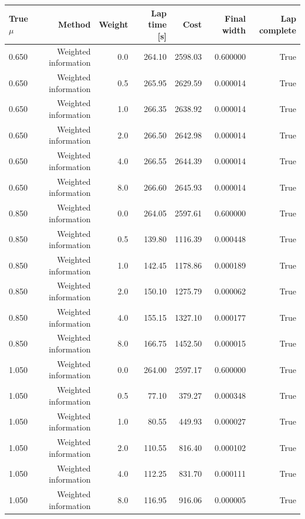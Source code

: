 \begin{tabular}{lrrrrrr}
\toprule
True $\mu$ & Method & Weight & Lap time [s] & Cost & Final width & Lap complete \\
\midrule
0.650 & Weighted information & 0.0 & 264.10 & 2598.03 & 0.600000 & True \\
0.650 & Weighted information & 0.5 & 265.95 & 2629.59 & 0.000014 & True \\
0.650 & Weighted information & 1.0 & 266.35 & 2638.92 & 0.000014 & True \\
0.650 & Weighted information & 2.0 & 266.50 & 2642.98 & 0.000014 & True \\
0.650 & Weighted information & 4.0 & 266.55 & 2644.39 & 0.000014 & True \\
0.650 & Weighted information & 8.0 & 266.60 & 2645.93 & 0.000014 & True \\
0.850 & Weighted information & 0.0 & 264.05 & 2597.61 & 0.600000 & True \\
0.850 & Weighted information & 0.5 & 139.80 & 1116.39 & 0.000448 & True \\
0.850 & Weighted information & 1.0 & 142.45 & 1178.86 & 0.000189 & True \\
0.850 & Weighted information & 2.0 & 150.10 & 1275.79 & 0.000062 & True \\
0.850 & Weighted information & 4.0 & 155.15 & 1327.10 & 0.000177 & True \\
0.850 & Weighted information & 8.0 & 166.75 & 1452.50 & 0.000015 & True \\
1.050 & Weighted information & 0.0 & 264.00 & 2597.17 & 0.600000 & True \\
1.050 & Weighted information & 0.5 & 77.10 & 379.27 & 0.000348 & True \\
1.050 & Weighted information & 1.0 & 80.55 & 449.93 & 0.000027 & True \\
1.050 & Weighted information & 2.0 & 110.55 & 816.40 & 0.000102 & True \\
1.050 & Weighted information & 4.0 & 112.25 & 831.70 & 0.000111 & True \\
1.050 & Weighted information & 8.0 & 116.95 & 916.06 & 0.000005 & True \\
\bottomrule
\end{tabular}
